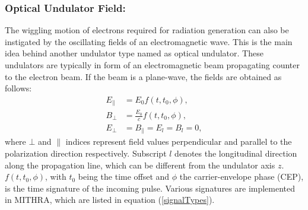 \subsubsection{Optical Undulator Field:}

The wiggling motion of electrons required for radiation generation can also be instigated by the oscillating fields of an electromagnetic wave.
%
This is the main idea behind another undulator type named as optical undulator.
%
These undulators are typically in form of an electromagnetic beam propagating counter to the electron beam.
%
If the beam is a plane-wave, the fields are obtained as follows:
%
\begin{align}
\label{opticalUndulatorPW}
E_\parallel & = E_0 f(t,t_0,\phi) , \nonumber \\
B_\bot & = \frac{E_0}{c} f(t,t_0,\phi), \\
E_\bot & = B_\parallel = E_l = B_l = 0, \nonumber
\end{align}
%
where $\bot$ and $\parallel$ indices represent field values perpendicular and parallel to the polarization direction respectively.
%
Subscript $l$ denotes the longitudinal direction along the propagation line, which can be different from the undulator axis $z$.
%
$f(t,t_0,\phi)$, with $t_0$ being the time offset and $\phi$ the carrier-envelope phase (CEP), is the time signature of the incoming pulse.
%
Various signatures are implemented in MITHRA, which are listed in equation (\ref{signalTypes}).

